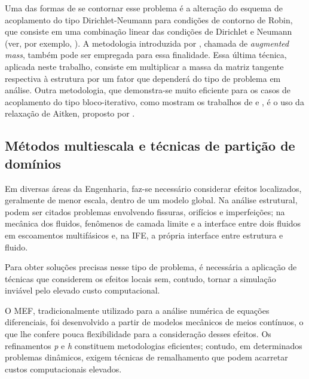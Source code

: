Uma das formas de se contornar esse problema é a alteração do esquema de acoplamento do tipo Dirichlet-Neumann para condições de contorno de Robin, que consiste em uma combinação linear das condições de Dirichlet e Neumann (ver, por exemplo, ). A metodologia introduzida por , chamada de \textit{augmented mass}, também pode ser empregada para essa finalidade. Essa última técnica, aplicada neste trabalho, consiste em multiplicar a massa da matriz tangente respectiva à estrutura por um fator que dependerá do tipo de problema em análise. Outra metodologia, que demonstra-se muito eficiente para os casos de acoplamento do tipo bloco-iterativo, como mostram os trabalhos de  e , é o uso da relaxação de Aitken, proposto por .

\subsection{Métodos multiescala e técnicas de partição de domínios}
\label{arlequinsection}

Em diversas áreas da Engenharia, faz-se necessário considerar efeitos localizados, geralmente de menor escala, dentro de um modelo global. Na análise estrutural, podem ser citados problemas envolvendo fissuras, orifícios e imperfeições; na mecânica dos fluidos, fenômenos de camada limite e a interface entre dois fluidos em escoamentos multifásicos e, na IFE, a própria interface entre estrutura e fluido.

Para obter soluções precisas nesse tipo de problema, é necessária a aplicação de técnicas que considerem os efeitos locais sem, contudo, tornar a simulação inviável pelo elevado custo computacional.

O MEF, tradicionalmente utilizado para a análise numérica de equações diferenciais, foi desenvolvido a partir de modelos mecânicos de meios contínuos, o que lhe confere pouca flexibilidade para a consideração desses efeitos. Os refinamentos \textit{p} e \textit{h} constituem metodologias eficientes; contudo, em determinados problemas dinâmicos, exigem técnicas de remalhamento que podem acarretar custos computacionais elevados.

